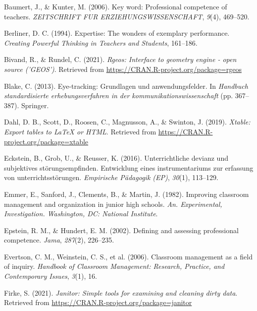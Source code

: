 \documentclass[
  man]{apa6}
\newlength{\cslhangindent}
\newenvironment{CSLReferences}[2] %
 {\begin{list}{}{%
  \setlength{\itemindent}{0pt}
  \setlength{\leftmargin}{0pt}
  \setlength{\parsep}{0pt}
  \ifodd #1
   \setlength{\leftmargin}{\cslhangindent}
   \setlength{\itemindent}{-1\cslhangindent}
  \fi
  \setlength{\itemsep}{#2\baselineskip}}}
 {\end{list}}
\begin{document}
\begin{CSLReferences}{1}{0}
Baumert, J., \& Kunter, M. (2006). Key word: Professional competence of teachers. \emph{ZEITSCHRIFT FUR ERZIEHUNGSWISSENSCHAFT}, \emph{9}(4), 469--520.

Berliner, D. C. (1994). Expertise: The wonders of exemplary performance. \emph{Creating Powerful Thinking in Teachers and Students}, 161--186.

Bivand, R., \& Rundel, C. (2021). \emph{Rgeos: Interface to geometry engine - open source ('GEOS')}. Retrieved from \url{https://CRAN.R-project.org/package=rgeos}

Blake, C. (2013). Eye-tracking: Grundlagen und anwendungsfelder. In \emph{Handbuch standardisierte erhebungsverfahren in der kommunikationswissenschaft} (pp. 367--387). Springer.

Dahl, D. B., Scott, D., Roosen, C., Magnusson, A., \& Swinton, J. (2019). \emph{Xtable: Export tables to LaTeX or HTML}. Retrieved from \url{https://CRAN.R-project.org/package=xtable}

Eckstein, B., Grob, U., \& Reusser, K. (2016). Unterrichtliche devianz und subjektives st{ö}rungsempfinden. Entwicklung eines instrumentariums zur erfassung von unterrichtsst{ö}rungen. \emph{Empirische P{ä}dagogik (EP)}, \emph{30}(1), 113--129.

Emmer, E., Sanford, J., Clements, B., \& Martin, J. (1982). Improving classroom management and organization in junior high schools. \emph{An. Experimental, Investigation. Washington, DC: National Institute}.

Epstein, R. M., \& Hundert, E. M. (2002). Defining and assessing professional competence. \emph{Jama}, \emph{287}(2), 226--235.

Evertson, C. M., Weinstein, C. S., et al. (2006). Classroom management as a field of inquiry. \emph{Handbook of Classroom Management: Research, Practice, and Contemporary Issues}, \emph{3}(1), 16.

Firke, S. (2021). \emph{Janitor: Simple tools for examining and cleaning dirty data}. Retrieved from \url{https://CRAN.R-project.org/package=janitor}


\end{CSLReferences}
\end{document}
